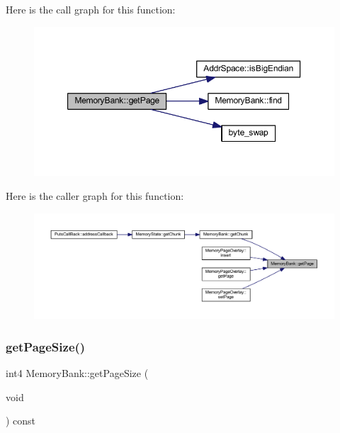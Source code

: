 Here is the call graph for this function\+:
\nopagebreak
\begin{figure}[H]
\begin{center}
\leavevmode
\includegraphics[width=350pt]{class_memory_bank_ac48e5c77befa62116190b34611ad4339_cgraph}
\end{center}
\end{figure}
Here is the caller graph for this function\+:
\nopagebreak
\begin{figure}[H]
\begin{center}
\leavevmode
\includegraphics[width=350pt]{class_memory_bank_ac48e5c77befa62116190b34611ad4339_icgraph}
\end{center}
\end{figure}
\mbox{\label{class_memory_bank_a020cac2b86f83b069c2f1914bc70cb2b}} 
\subsubsection{\texorpdfstring{getPageSize()}{getPageSize()}}
{\footnotesize\ttfamily int4 Memory\+Bank\+::get\+Page\+Size (\begin{DoxyParamCaption}\item[{void}]{ }\end{DoxyParamCaption}) const\hspace{0.3cm}{\ttfamily [inline]}}



